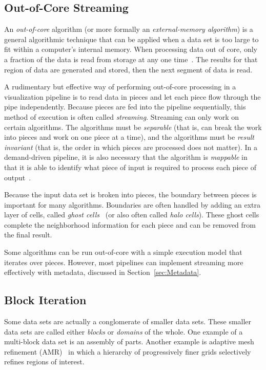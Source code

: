 \documentclass[journal,twocolumn,10pt,letterpaper,twoside]{IEEEtran}
\newcommand*{\lcite}[1]{~\cite{#1}}
\newcommand*{\keyterm}[1]{\emph{#1}}
\begin{document}
\subsection{Out-of-Core Streaming}
\label{sec:OutOfCore}

An \keyterm{out-of-core} algorithm (or more formally an
\keyterm{external-memory algorithm}) is a general algorithmic technique
that can be applied when a data set is too large to fit within a computer's
internal memory.  When processing data out of core, only a fraction of the
data is read from storage at any one time\lcite{Vitter2001}.  The results
for that region of data are generated and stored, then the next segment of
data is read.

A rudimentary but effective way of performing out-of-core processing in a
visualization pipeline is to read data in pieces and let each piece flow
through the pipe independently.  Because pieces are fed into the pipeline
sequentially, this method of execution is often called \keyterm{streaming}.
Streaming can only work on certain algorithms.  The algorithms must be
\keyterm{separable} (that is, can break the work into pieces and work on
one piece at a time), and the algorithms must be \keyterm{result invariant}
(that is, the order in which pieces are processed does not matter).  In a
demand-driven pipeline, it is also necessary that the algorithm is
\keyterm{mappable} in that it is able to identify what piece of input is
required to process each piece of output\lcite{Law1999}.

Because the input data set is broken into pieces, the boundary between
pieces is important for many algorithms.  Boundaries are often handled by
adding an extra layer of cells, called \keyterm{ghost
  cells}\lcite{Ahrens2001} (or also often called \keyterm{halo cells}).
These ghost cells complete the neighborhood information for each piece and
can be removed from the final result.

Some algorithms can be run out-of-core with a simple execution model that
iterates over pieces.  However, most pipelines can implement streaming more
effectively with metadata, discussed in Section~\ref{sec:Metadata}.

\subsection{Block Iteration}
\label{sec:BlockIteration}

Some data sets are actually a conglomerate of smaller data sets.  These
smaller data sets are called either \keyterm{blocks} or \keyterm{domains}
of the whole.  One example of a multi-block data set is an assembly of
parts.  Another example is adaptive mesh refinement (AMR)\lcite{Berger1989}
in which a hierarchy of progressively finer grids selectively refines
regions of interest.
\end{document}

